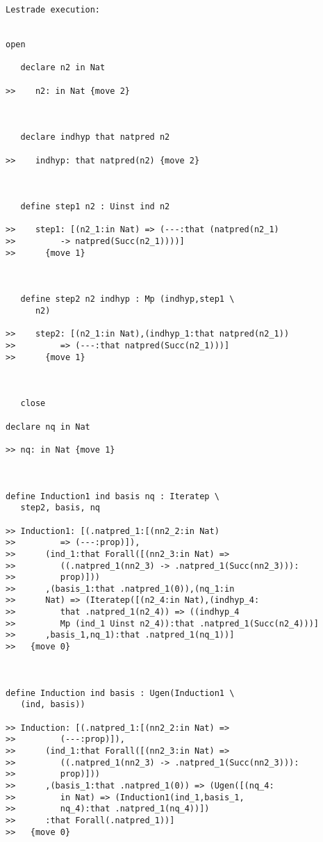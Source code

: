 \documentclass[12pt]{article}
\begin{document}
\begin{verbatim}Lestrade execution:


open

   declare n2 in Nat

>>    n2: in Nat {move 2}



   declare indhyp that natpred n2

>>    indhyp: that natpred(n2) {move 2}



   define step1 n2 : Uinst ind n2

>>    step1: [(n2_1:in Nat) => (---:that (natpred(n2_1)
>>         -> natpred(Succ(n2_1))))]
>>      {move 1}



   define step2 n2 indhyp : Mp (indhyp,step1 \
      n2)

>>    step2: [(n2_1:in Nat),(indhyp_1:that natpred(n2_1))
>>         => (---:that natpred(Succ(n2_1)))]
>>      {move 1}



   close

declare nq in Nat

>> nq: in Nat {move 1}



define Induction1 ind basis nq : Iteratep \
   step2, basis, nq

>> Induction1: [(.natpred_1:[(nn2_2:in Nat)
>>         => (---:prop)]),
>>      (ind_1:that Forall([(nn2_3:in Nat) =>
>>         ((.natpred_1(nn2_3) -> .natpred_1(Succ(nn2_3))):
>>         prop)]))
>>      ,(basis_1:that .natpred_1(0)),(nq_1:in
>>      Nat) => (Iteratep([(n2_4:in Nat),(indhyp_4:
>>         that .natpred_1(n2_4)) => ((indhyp_4
>>         Mp (ind_1 Uinst n2_4)):that .natpred_1(Succ(n2_4)))]
>>      ,basis_1,nq_1):that .natpred_1(nq_1))]
>>   {move 0}



define Induction ind basis : Ugen(Induction1 \
   (ind, basis))

>> Induction: [(.natpred_1:[(nn2_2:in Nat) =>
>>         (---:prop)]),
>>      (ind_1:that Forall([(nn2_3:in Nat) =>
>>         ((.natpred_1(nn2_3) -> .natpred_1(Succ(nn2_3))):
>>         prop)]))
>>      ,(basis_1:that .natpred_1(0)) => (Ugen([(nq_4:
>>         in Nat) => (Induction1(ind_1,basis_1,
>>         nq_4):that .natpred_1(nq_4))])
>>      :that Forall(.natpred_1))]
>>   {move 0}


\end{verbatim}
\end{document}
